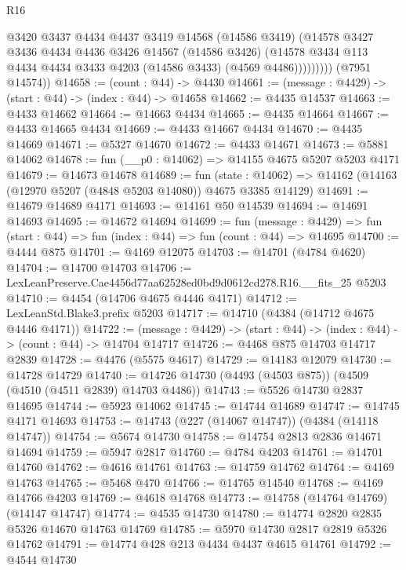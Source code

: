 \begin{lexlean}{R16}
\begin{coremodule}
                  @3420
                  @3437
                  @4434
                  @4437
                  @3419
                  @14568
                  (@14586 @3419)
                  (@14578
                    @3427
                    @3436
                    @4434
                    @4436
                    @3426
                    @14567
                    (@14586 @3426)
                    (@14578 @3434 @113 @4434 @4434 @3433 @4203 (@14586 @3433) (@4569 @4486)))))))))
      (@7951 @14574))
@14658 := (count : @44) -> @4430
@14661 := (message : @4429) -> (start : @44) -> (index : @44) -> @14658
@14662 := @4435 @14537
@14663 := @4433 @14662
@14664 := @14663 @4434
@14665 := @4435 @14664
@14667 := @4433 @14665 @4434
@14669 := @4433 @14667 @4434
@14670 := @4435 @14669
@14671 := @5327 @14670
@14672 := @4433 @14671
@14673 := @5881 @14062
@14678 := fun (__p0 : @14062) => @14155 @4675 @5207 @5203 @4171
@14679 := @14673 @14678
@14689 := fun (state : @14062) =>
  @14162 (@14163 (@12970 @5207 (@4848 @5203 @14080)) @4675 @3385 @14129)
@14691 := @14679 @14689 @4171
@14693 := @14161 @50 @14539
@14694 := @14691 @14693
@14695 := @14672 @14694
@14699 := fun (message : @4429) =>
  fun (start : @44) => fun (index : @44) => fun (count : @44) => @14695
@14700 := @4444 @875
@14701 := @4169 @12075
@14703 := @14701 (@4784 @4620)
@14704 := @14700 @14703
@14706 := LexLeanPreserve.Cae4456d77aa62528ed0bd9d0612cd278.R16.__fits_25 @5203
@14710 := @4454 (@14706 @4675 @4446 @4171)
@14712 := LexLeanStd.Blake3.prefix @5203
@14717 := @14710 (@4384 (@14712 @4675 @4446 @4171))
@14722 := (message : @4429) -> (start : @44) -> (index : @44) -> (count : @44) -> @14704 @14717
@14726 := @4468 @875 @14703 @14717 @2839
@14728 := @4476 (@5575 @4617)
@14729 := @14183 @12079
@14730 := @14728 @14729
@14740 := @14726 @14730 (@4493 (@4503 @875)) (@4509 (@4510 (@4511 @2839) @14703 @4486))
@14743 := @5526 @14730 @2837 @14695
@14744 := @5923 @14062
@14745 := @14744 @14689
@14747 := @14745 @4171 @14693
@14753 := @14743 (@227 (@14067 @14747)) (@4384 (@14118 @14747))
@14754 := @5674 @14730
@14758 := @14754 @2813 @2836 @14671 @14694
@14759 := @5947 @2817
@14760 := @4784 @4203
@14761 := @14701 @14760
@14762 := @4616 @14761
@14763 := @14759 @14762
@14764 := @4169 @14763
@14765 := @5468 @470
@14766 := @14765 @14540
@14768 := @4169 @14766 @4203
@14769 := @4618 @14768
@14773 := @14758 (@14764 @14769) (@14147 @14747)
@14774 := @4535 @14730
@14780 := @14774 @2820 @2835 @5326 @14670 @14763 @14769
@14785 := @5970 @14730 @2817 @2819 @5326 @14762
@14791 := @14774 @428 @213 @4434 @4437 @4615 @14761
@14792 := @4544 @14730

\end{coremodule}
\end{lexlean}
